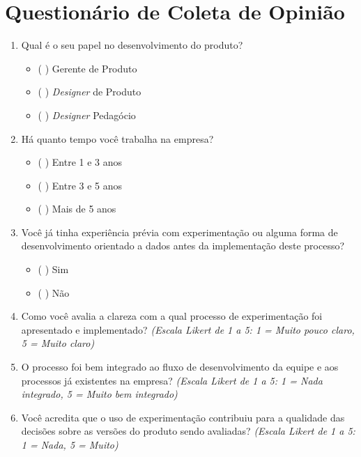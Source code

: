 \chapter{Questionário de Coleta de Opinião}
   \label{apdx:questionario}
       
    \begin{enumerate}
        \item Qual é o seu papel no desenvolvimento do produto?
        \begin{itemize}
            \item ( ) Gerente de Produto
            \item ( ) \textit{Designer} de Produto
            \item ( ) \textit{Designer} Pedagócio
        \end{itemize}

        \item Há quanto tempo você trabalha na empresa?
        \begin{itemize}
            \item ( ) Entre 1 e 3 anos
            \item ( ) Entre 3 e 5 anos
            \item ( ) Mais de 5 anos
        \end{itemize}
    
        \item Você já tinha experiência prévia com experimentação ou alguma forma de desenvolvimento orientado a dados antes da implementação deste processo?
        \begin{itemize}
            \item ( ) Sim
            \item ( ) Não
        \end{itemize}
    
        \item Como você avalia a clareza com a qual processo de experimentação foi apresentado e implementado?  
        \textit{(Escala Likert de 1 a 5: 1 = Muito pouco claro, 5 = Muito claro)}
    
        \item O processo foi bem integrado ao fluxo de desenvolvimento da equipe e aos processos já existentes na empresa?  
        \textit{(Escala Likert de 1 a 5: 1 = Nada integrado, 5 = Muito bem integrado)}
    
        \item Você acredita que o uso de experimentação contribuiu para a qualidade das decisões sobre as versões do produto sendo avaliadas?  
        \textit{(Escala Likert de 1 a 5: 1 = Nada, 5 = Muito)}
    

\end{enumerate}
